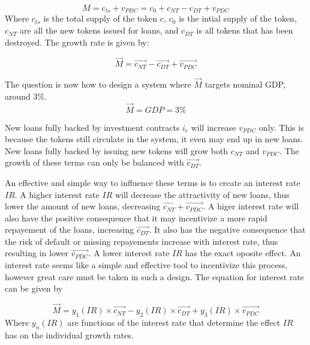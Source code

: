 \begin{equation}
    M = c_{ts} + v_{PDC} = c_{0} + c_{NT} - c_{DT} + v_{PDC}
\end{equation}
Where $c_{ts}$ is the total supply of the token c, $c_{0}$ is the intial supply of the token, $c_{NT}$ are all the new tokens issued for loans, and $c_{DT}$ is all tokens that has been destroyed. The growth rate is given by:

\begin{equation}
    \overrightarrow{M} = \overrightarrow{c_{NT}} - \overrightarrow{c_{DT}} + \overrightarrow{v_{PDC}}
\end{equation}

The question is now how to design a system where $\overrightarrow{M}$ targets nominal GDP, around 3\%.
\begin{equation}
    \overrightarrow{M} = GDP = 3\%
\end{equation}

New loans fully backed by investment contracts $i_{c}$ will increase $v_{PDC}$ only. This is because the tokens still circulate in the system, it even may end up in new loans. New loans fully backed by issuing new tokens will grow both $c_{NT}$ and $v_{PDC}$. The growth of these terms can only be balanced with $\overrightarrow{c_{DT}}$. 

An effective and simple way to influence these terms is to create an interest rate $IR$. A higher interest rate $IR$ will decrease the attractivity of new loans, thus lower the amount of new loans, decreasing $\overrightarrow{c_{NT}} + \overrightarrow{v_{PDC}}$. A higer interest rate will also have the positive consequence that it may incentivize a more rapid repayement of the loans, increasing $\overrightarrow{c_{DT}}$. It also has the negative consequence that the risk of default or missing repayements increase with interest rate, thus resulting in lower $\overrightarrow{v_{PDC}}$. A lower interest rate $IR$ has the exact oposite effect. An interest rate seems like a simple and effective tool to incentivize this process, however great care must be taken in such a design. The equation for interest rate can be given by

\begin{equation}
    \overrightarrow{M} = y_{1}(IR) \times \overrightarrow{c_{NT}} - y_{2}(IR) \times \overrightarrow{c_{DT}} + y_{3}(IR) \times \overrightarrow{v_{PDC}}
\end{equation}
Where $y_{n}(IR)$ are functions of the interest rate that determine the effect $IR$ has on the individual growth rates. 

